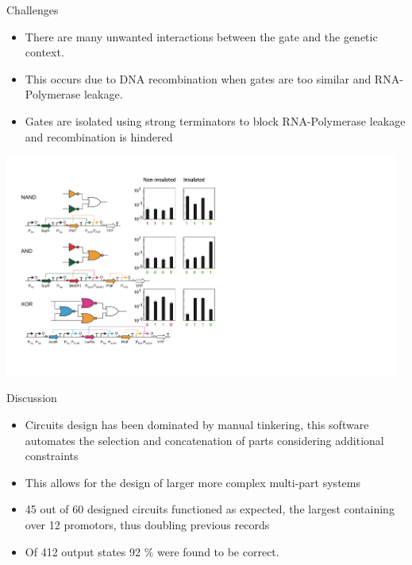 \documentclass[10pt]{beamer}
\begin{document}
\begin{frame}{Challenges}
    \centering
    \begin{minipage}{.4\textwidth}
        \centering
        \begin{itemize}
            \item There are many unwanted interactions between the gate and the genetic context. 
            \item This occurs due to DNA recombination when gates are too similar and RNA-Polymerase leakage. 
            \item Gates are isolated using strong terminators to block RNA-Polymerase leakage and recombination is hindered
        \end{itemize}
    \end{minipage}%
    \begin{minipage}{.6\textwidth}
        \centering
        \includegraphics[width=13cm]{challenges_.jpg}
    \end{minipage}
\end{frame}

\begin{frame}{Discussion}
  \begin{itemize}[<+- | alert@+>]
    \item Circuits design has been dominated by manual tinkering, this software automates the selection and concatenation of parts considering additional constraints
    \item This allows for the design of larger more complex multi-part systems
    \item 45 out of 60 designed circuits functioned as expected, the largest containing over 12 promotors, thus doubling previous records 
    \item Of 412 output states 92 \% were found to be correct.
  \end{itemize}
  \nocite{Cloney2016SyntheticDesign}
\end{frame}
    
\end{document}
